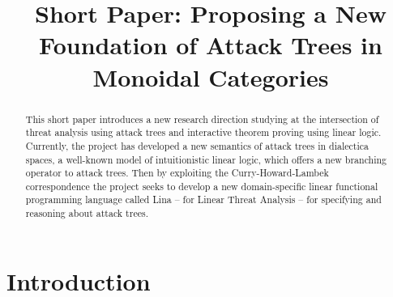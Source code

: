 \documentclass{sigplanconf}
\date{}
\begin{document}
\copyrightdata{}
\copyrightdoi{}
\titlebanner{}

\title{Short Paper: Proposing a New Foundation of Attack Trees in Monoidal Categories}


\maketitle 

\begin{abstract}
  This short paper introduces a new research direction studying at the
  intersection of threat analysis using attack trees and interactive
  theorem proving using linear logic.  Currently, the project has
  developed a new semantics of attack trees in dialectica spaces, a
  well-known model of intuitionistic linear logic, which offers a new
  branching operator to attack trees.  Then by exploiting the
  Curry-Howard-Lambek correspondence the project seeks to develop a
  new domain-specific linear functional programming language called
  Lina -- for Linear Threat Analysis -- for specifying and reasoning
  about attack trees.
\end{abstract}


\section{Introduction}
\label{sec:introduction}
\end{document}
